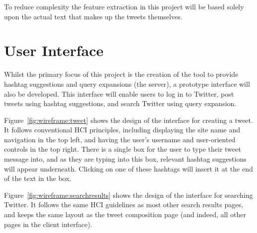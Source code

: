 \documentclass[11pt,a4paper]{report}
\begin{document}
To reduce complexity the feature extraction in this project will be based solely upon the actual text that makes up the tweets themselves.

\section{User Interface}
\label{sec:wireframes}
Whilst the primary focus of this project is the creation of the tool to provide hashtag suggestions and query expansions (the server), a prototype interface will also be developed. This interface will enable users to log in to Twitter, post tweets using hashtag suggestions, and search Twitter using query expansion.

Figure~\ref{fig:wireframe:tweet} shows the design of the interface for creating a tweet. It follows conventional HCI principles, including displaying the site name and navigation in the top left, and having the user's username and user-oriented controls in the top right. There is a single box for the user to type their tweet message into, and as they are typing into this box, relevant hashtag suggestions will appear underneath. Clicking on one of these hashtags will insert it at the end of the text in the box.

Figure~\ref{fig:wireframe:searchresults} shows the design of the interface for searching Twitter. It follows the same HCI guidelines as most other search results pages, and keeps the same layout as the tweet composition page (and indeed, all other pages in the client interface).
\end{document}
